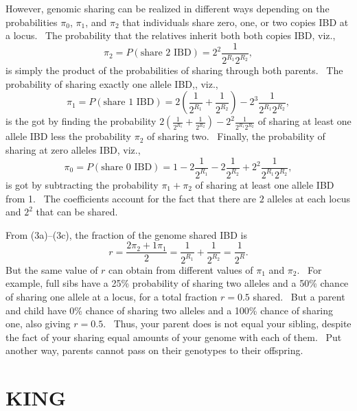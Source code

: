 \documentclass[
]{book}
\begin{document}
However, genomic sharing can be realized in different ways depending on the probabilities \(\pi_0\), \(\pi_1\), and \(\pi_2\) that individuals share zero, one, or two copies IBD at a locus.~ The probability that the relatives inherit both both copies IBD, viz.,\begin{equation}\pi_2=P\left(\text{share 2 IBD}\right)=2^2\frac{1}{2^{R_1}2^{R_2}},\tag{3a}\end{equation} is simply the product of the probabilities of sharing through both parents.~ The probability of sharing exactly one allele IBD,, viz.,\begin{equation}\pi_1=P\left(\text{share 1 IBD}\right)=2\left(\frac{1}{2^{R_1}}+\frac{1}{2^{R_2}}\right)-2^3\frac{1}{2^{R_1}2^{R_2}},\tag{3b}\end{equation} is the got by finding the probability \(2\left(\frac{1}{2^{R_1}}+\frac{1}{2^{R_2}}\right)-2^2\frac{1}{2^{R_1}2^{R_2}}\) of sharing at least one allele IBD less the probability \(\pi_2\) of sharing two.~ Finally, the probability of sharing at zero alleles IBD, viz.,\begin{equation}\pi_0=P\left(\text{share 0 IBD}\right)=1-2\frac{1}{2^{R_1}}-2\frac{1}{2^{R_2}}+2^2\frac{1}{2^{R_1}2^{R_2}},\tag{3c}\end{equation}is got by subtracting the probability \(\pi_1+\pi_2\) of sharing at least one allele IBD from 1.~ The coefficients account for the fact that there are \(2\) alleles at each locus and \(2^2\) that can be shared.

From (3a)--(3c), the fraction of the genome shared IBD is\begin{equation}r=\frac{2\pi_2+1\pi_1}{2}=\frac{1}{2^{R_1}}+\frac{1}{2^{R_2}}=\frac{1}{2^R}.\tag{4}\end{equation}But the same value of \(r\) can obtain from different values of \(\pi_1\) and \(\pi_2\).~ For example, full sibs have a 25\% probability of sharing two alleles and a 50\% chance of sharing one allele at a locus, for a total fraction \(r=0.5\) shared.~ But a parent and child have 0\% chance of sharing two alleles and a 100\% chance of sharing one, also giving \(r=0.5\).~ Thus, your parent does is not equal your sibling, despite the fact of your sharing equal amounts of your genome with each of them.~ Put another way, parents cannot pass on their genotypes to their offspring.

\hypertarget{king}{%
\section{KING}\label{king}}
\end{document}
